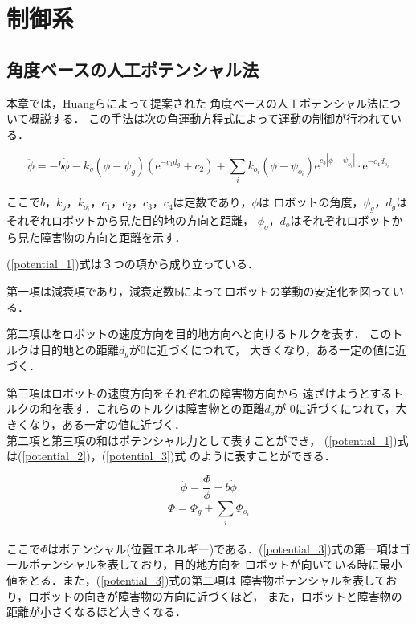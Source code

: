 \documentclass[10pt,a4j]{jarticle}
\begin{document}
\section{制御系}
\subsection{角度ベースの人工ポテンシャル法}
本章では，Huangらによって提案された
角度ベースの人工ポテンシャル法\cite{Huang}について概説する．
この手法は次の角運動方程式によって運動の制御が行われている．

\begin{equation}
 \ddot{\phi}=-b\dot{\phi}-k_g(\phi-\psi_g)(\mathrm{e}^{-c_1d_g}+c_2)+
 \sum_i k_{o_i}(\phi-\psi_{o_i})\mathrm{e}^{c_3|\phi-\psi_{o_i}|}
 \cdot \mathrm{e}^{-c_4d_{o_i}}
 \label{potential_1}
\end{equation}

ここで$b，k_g，k_{o_i}，c_1，c_2，c_3，c_4は定数であり，\phi$は
ロボットの角度，$\phi_g，d_g$はそれぞれロボットから見た目的地の方向と距離，
$\phi_o，d_o$はそれぞれロボットから見た障害物の方向と距離を示す．

(\ref{potential_1})式は３つの項から成り立っている．

第一項は減衰項であり，減衰定数bによってロボットの挙動の安定化を図っている．

第二項はをロボットの速度方向を目的地方向へと向けるトルクを表す．
このトルクは目的地との距離$d_g$が0に近づくにつれて，
大きくなり，ある一定の値に近づく．

第三項はロボットの速度方向をそれぞれの障害物方向から
遠ざけようとするトルクの和を表す．これらのトルクは障害物との距離$d_o$が
0に近づくにつれて，大きくなり，ある一定の値に近づく．
\\
第二項と第三項の和はポテンシャル力として表すことができ，
(\ref{potential_1})式は(\ref{potential_2})，(\ref{potential_3})式
のように表すことができる．

\begin{equation}
 \ddot{\phi}=\frac{\Phi}{\phi}-b\dot{\phi}
 \label{potential_2}
\end{equation}
\begin{equation}
 \Phi=\Phi_g+\sum_i \Phi_{o_i}
 \label{potential_3}
\end{equation}
\\ここで$\Phi$はポテンシャル(位置エネルギー)である．(\ref{potential_3})式の第一項はゴールポテンシャルを表しており，目的地方向を
ロボットが向いている時に最小値をとる．また，(\ref{potential_3})式の第二項は
障害物ポテンシャルを表しており，ロボットの向きが障害物の方向に近づくほど，
また，ロボットと障害物の距離が小さくなるほど大きくなる．
\end{document}
